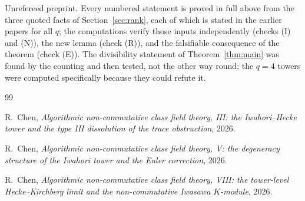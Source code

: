 \documentclass[11pt]{amsart}
\numberwithin{equation}{section}
\theoremstyle{definition}
\theoremstyle{remark}
\begin{document}
Unrefereed preprint. Every numbered statement is proved in full above from the three
quoted facts of Section~\ref{sec:rank}, each of which is stated in the earlier papers for
all $q$; the computations verify those inputs independently (checks (I) and (N)), the new
lemma (check (R)), and the falsifiable consequence of the theorem (check (E)). The
divisibility statement of Theorem~\ref{thm:main} was found by the counting and then
tested, not the other way round; the $q=4$ towers were computed specifically because they
could refute it.

\begin{thebibliography}{99}

 R.~Chen, \emph{Algorithmic non-commutative class field theory, III: the
Iwahori--Hecke tower and the type III dissolution of the trace obstruction}, 2026.

 R.~Chen, \emph{Algorithmic non-commutative class field theory, V: the
degeneracy structure of the Iwahori tower and the Euler correction}, 2026.

 R.~Chen, \emph{Algorithmic non-commutative class field theory, VIII: the
tower-level Hecke--Kirchberg limit and the non-commutative Iwasawa $K$-module}, 2026.

\end{thebibliography}
\end{document}
